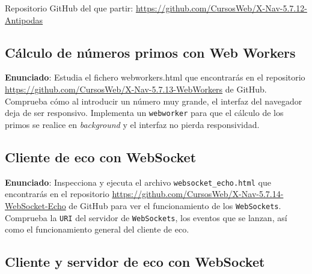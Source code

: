 
Repositorio GitHub del que partir: \url{https://github.com/CursosWeb/X-Nav-5.7.12-Antipodas}


\subsection{Cálculo de números primos con Web Workers}
\label{subsec:webworker-primos}

\textbf{Enunciado}: Estudia el fichero webworkers.html que encontrarás en el repositorio \url{https://github.com/CursosWeb/X-Nav-5.7.13-WebWorkers} de GitHub. Comprueba cómo al introducir un número muy grande, el interfaz del navegador deja de ser responsivo. Implementa un \texttt{webworker} para que el cálculo de los primos se realice en \emph{background} y el interfaz no pierda responsividad.

\subsection{Cliente de eco con WebSocket}
\label{subsec:websocket-cliente-eco}

\textbf{Enunciado}: Inspecciona y ejecuta el archivo \texttt{websocket\_echo.html} que encontrarás en el repositorio \url{https://github.com/CursosWeb/X-Nav-5.7.14-WebSocket-Echo} de GitHub para ver el funcionamiento de los \texttt{WebSockets}. Comprueba la \texttt{URI} del servidor de \texttt{WebSockets}, los eventos que se lanzan, así como el funcionamiento general del cliente de eco.


\subsection{Cliente y servidor de eco con WebSocket}
\label{subsec:websocket-cliente-servidor-eco}

